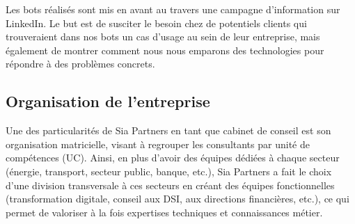 \documentclass{article} %
\begin{document}
Les bots réalisés sont mis en avant au travers une campagne d’information sur LinkedIn. Le but est de susciter le besoin chez de potentiels clients qui trouveraient dans nos bots un cas d’usage au sein de leur entreprise, mais également de montrer comment nous nous emparons des technologies pour répondre à des problèmes concrets.

\subsection{Organisation de l'entreprise}
Une des particularités de Sia Partners en tant que cabinet de conseil est son organisation matricielle, visant à regrouper les consultants par unité de compétences (UC). Ainsi, en plus d’avoir des équipes dédiées à chaque secteur (énergie, transport, secteur public, banque, etc.), Sia Partners a fait le choix d’une division transversale à ces secteurs en créant des équipes fonctionnelles (transformation digitale, conseil aux DSI, aux directions financières, etc.), ce qui permet de valoriser à la fois expertises techniques et connaissances métier. \\
\end{document}
